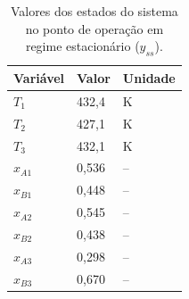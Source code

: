 \begin{table}[h]
  \caption{Valores dos estados do sistema no ponto de operação em regime estacionário ($y_{ss}$).}
  \label{tab:y_ss}
  \centering
  \begin{tabular}{lll}
    \hline
    Variável & Valor   & Unidade \\
    \hline
    $T_1$    & 432{,}4 & K       \\
    $T_2$    & 427{,}1 & K       \\
    $T_3$    & 432{,}1 & K       \\
    $x_{A1}$ & 0{,}536 & --      \\
    $x_{B1}$ & 0{,}448 & --      \\
    $x_{A2}$ & 0{,}545 & --      \\
    $x_{B2}$ & 0{,}438 & --      \\
    $x_{A3}$ & 0{,}298 & --      \\
    $x_{B3}$ & 0{,}670 & --      \\
    \hline
  \end{tabular}
\end{table}
